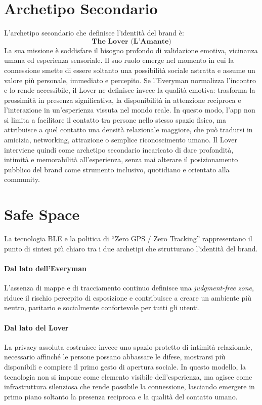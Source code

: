 \documentclass[a4paper, 11pt, table, dvipsnames]{article}
\begin{document}
\section{Archetipo Secondario}
L'archetipo secondario che definisce l'identità del brand è:
\[
      \textbf{The Lover (L'Amante)}
\]
La sua missione è soddisfare il bisogno profondo di
validazione emotiva, vicinanza umana ed esperienza sensoriale.
Il suo ruolo emerge nel momento in cui la connessione
smette di essere soltanto una possibilità sociale astratta
e assume un valore più personale, immediato e percepito.
Se l'Everyman normalizza l'incontro e lo rende accessibile,
il Lover ne definisce invece la qualità emotiva: trasforma
la prossimità in presenza significativa, la disponibilità in
attenzione reciproca e l'interazione in un'esperienza vissuta
nel mondo reale. In questo modo, l'app non si limita a facilitare
il contatto tra persone nello stesso spazio fisico, ma
attribuisce a quel contatto una densità relazionale
maggiore, che può tradursi in amicizia, networking, attrazione
o semplice riconoscimento umano. Il Lover interviene
quindi come archetipo secondario incaricato di dare
profondità, intimità e memorabilità all'esperienza, senza
mai alterare il posizionamento pubblico del brand come
strumento inclusivo, quotidiano e orientato alla community.

\section{Safe Space}
La tecnologia BLE e la politica di ``Zero GPS / Zero
Tracking'' rappresentano il punto di sintesi più chiaro tra i
due archetipi che strutturano l'identità del brand.

\paragraph{Dal lato dell'Everyman}
L'assenza di mappe e di tracciamento continuo definisce
una \textit{judgment-free zone}, riduce il rischio
percepito di esposizione e contribuisce a creare un
ambiente più neutro, paritario e socialmente confortevole per
tutti gli utenti.
\paragraph{Dal lato del Lover}
La privacy assoluta costruisce invece uno spazio protetto di
intimità relazionale, necessario affinché le persone
possano abbassare le difese, mostrarsi più disponibili e compiere
il primo gesto di apertura sociale. In questo modello, la tecnologia
non si impone come elemento visibile dell'esperienza, ma
agisce come infrastruttura silenziosa che rende possibile
la connessione, lasciando emergere in primo piano soltanto
la presenza reciproca e la qualità del contatto umano.
\end{document}

